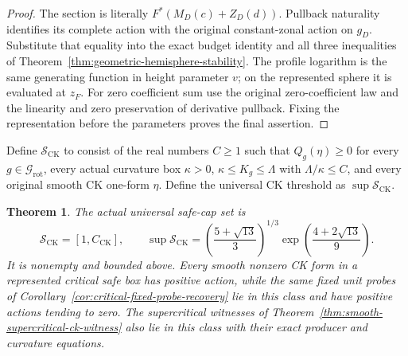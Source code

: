 \documentclass[11pt]{article}
\newtheorem{theorem}{Theorem}[section]
\begin{document}
\begin{proof}
The section is literally $F^*(M_D(c)+Z_D(d))$. Pullback naturality identifies
its complete action with the original constant-zonal action on $g_D$.
Substitute that equality into the exact budget identity and all three
inequalities of Theorem~\ref{thm:geometric-hemisphere-stability}.
The profile logarithm is the same generating function in height parameter
$v$; on the represented sphere it is evaluated at $z_F$.
For zero coefficient sum use the original zero-coefficient law and the
linearity and zero preservation of derivative pullback.
Fixing the representation before the parameters proves the final assertion.
\end{proof}

Define $\mathcal S_{\mathrm{CK}}$ to consist of the real numbers $C\geq1$
such that $Q_g(\eta)\geq0$ for every $g\in\mathcal G_{\mathrm{rot}}$,
every actual curvature box $\kappa>0$, $\kappa\leq K_g\leq\Lambda$ with
$\Lambda/\kappa\leq C$, and every original smooth CK one-form $\eta$.
Define the universal CK threshold as $\sup\mathcal S_{\mathrm{CK}}$.

\begin{theorem}\label{thm:universal-ck-threshold}
The actual universal safe-cap set is
\begin{equation}\label{eq:universal-ck-safe-set}
 \mathcal S_{\mathrm{CK}}=[1,C_{\mathrm{CK}}],
 \qquad
 \sup\mathcal S_{\mathrm{CK}}
 =\left(\frac{5+\sqrt{13}}3\right)^{1/3}
       \exp\left(\frac{4+2\sqrt{13}}9\right).
\end{equation}
It is nonempty and bounded above. Every smooth nonzero CK form in a
represented critical safe box has positive action, while the same fixed
unit probes of Corollary~\ref{cor:critical-fixed-probe-recovery} lie in this
class and have positive actions tending to zero. The supercritical witnesses
of Theorem~\ref{thm:smooth-supercritical-ck-witness} also lie in this class
with their exact producer and curvature equations.
\end{theorem}
\end{document}
